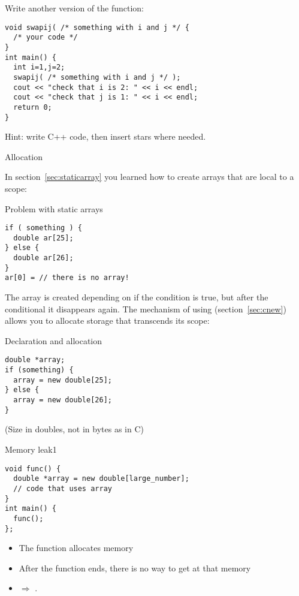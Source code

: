 \begin{exercise}
  \label{ex:c-star-swap}
  Write another version of the  function:
\begin{verbatim}
void swapij( /* something with i and j */ {
  /* your code */
}
int main() {
  int i=1,j=2;
  swapij( /* something with i and j */ );
  cout << "check that i is 2: " << i << endl;
  cout << "check that j is 1: " << i << endl;
  return 0;
}
\end{verbatim}
Hint: write C++ code, then insert stars where needed.
\end{exercise}

 {Allocation}

In section~\ref{sec:staticarray} you learned how to create arrays that
are local to a scope:

\begin{block}{Problem with static arrays}
  \label{sl:no-static-alloc}
\begin{verbatim}
if ( something ) {
  double ar[25];
} else {
  double ar[26];
}
ar[0] = // there is no array!
\end{verbatim}
\end{block}

The array  is created depending on if the condition is true, but
after
the conditional it disappears again. The mechanism of using
 (section~\ref{sec:cnew}) allows you to allocate
storage that transcends its scope:

\begin{block}{Declaration and allocation}
  \label{sl:c-array-new}
\begin{verbatim}
double *array;
if (something) {
  array = new double[25];
} else {
  array = new double[26];
}
\end{verbatim}
(Size in doubles, not in bytes as in C)
\end{block}

\begin{block}{Memory leak1}
  \label{sl:leak1}
\begin{verbatim}
void func() {
  double *array = new double[large_number];
  // code that uses array
}
int main() {
  func();
};
\end{verbatim}
\begin{itemize}
\item
  The function allocates memory
\item After the function ends, there is no way to get at that memory
\item $\Rightarrow$ .
\end{itemize}

\end{block}

